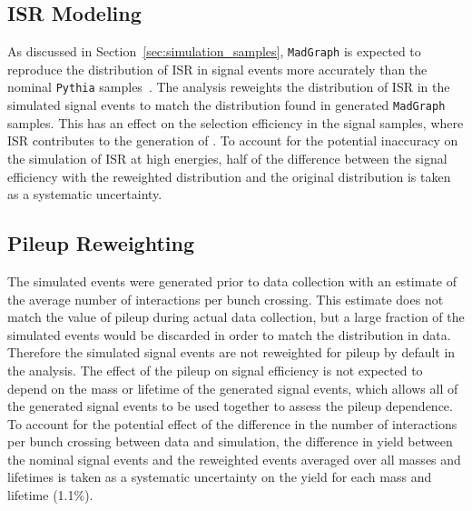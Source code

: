 \subsection{\ac{ISR} Modeling}
As discussed in Section~\ref{sec:simulation_samples}, \texttt{MadGraph} is expected to reproduce the distribution of \ac{ISR} in signal events more accurately than the nominal \texttt{Pythia} samples~\cite{SUSY-2014-09}.
The analysis reweights the distribution of \ac{ISR} in the simulated signal events to match the distribution found in generated \texttt{MadGraph} samples.
This has an effect on the selection efficiency in the signal samples, where \ac{ISR} contributes to the generation of \met.
To account for the potential inaccuracy on the simulation of \ac{ISR} at high energies, half of the difference between the signal efficiency with the reweighted distribution and the original distribution is taken as a systematic uncertainty.

\subsection{Pileup Reweighting}
The simulated events were generated prior to data collection with an estimate of the average number of interactions per bunch crossing.
This estimate does not match the value of pileup during actual data collection, but a large fraction of the simulated events would be discarded in order to match the distribution in data.
Therefore the simulated signal events are not reweighted for pileup by default in the analysis.
The effect of the pileup on signal efficiency is not expected to depend on the mass or lifetime of the generated signal events, which allows all of the generated signal events to be used together to assess the pileup dependence.
To account for the potential effect of the difference in the number of interactions per bunch crossing between data and simulation, the difference in yield between the nominal signal events and the reweighted events averaged over all masses and lifetimes is taken as a systematic uncertainty on the yield for each mass and lifetime (1.1\%).

